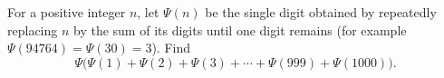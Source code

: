 For a positive integer $n$, let $\Psi(n)$ be the single digit obtained by repeatedly replacing $n$ by the sum of its digits until one digit remains (for example $\Psi(94764)=\Psi(30)=3$). Find
\[
\Psi\bigl(\Psi(1)+\Psi(2)+\Psi(3)+\cdots+\Psi(999)+\Psi(1000)\bigr).
\]
